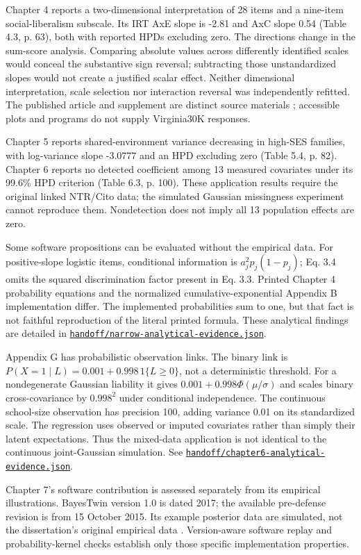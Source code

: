 \documentclass[11pt]{article}
\newcommand{\file}[1]{\href{https://github.com/alectionary/vibe-math/blob/master/formalization/schwabe-psychometric-genetics/#1}{\nolinkurl{#1}}}
\begin{document}
Chapter 4 reports a two-dimensional interpretation of 28 items and a nine-item social-liberalism subscale. Its IRT AxE slope is -2.81 and AxC slope 0.54 (Table 4.3, p. 63), both with reported HPDs excluding zero. The directions change in the sum-score analysis. Comparing absolute values across differently identified scales would conceal the substantive sign reversal; subtracting those unstandardized slopes would not create a justified scalar effect. Neither dimensional interpretation, scale selection nor interaction reversal was independently refitted. The published article and supplement are distinct source materials \citep{schwabeConservatism}; accessible plots and programs do not supply Virginia30K responses.

Chapter 5 reports shared-environment variance decreasing in high-SES families, with log-variance slope -3.0777 and an HPD excluding zero (Table 5.4, p. 82). Chapter 6 reports no detected coefficient among 13 measured covariates under its 99.6\% HPD criterion (Table 6.3, p. 100). These application results require the original linked NTR/Cito data; the simulated Gaussian missingness experiment cannot reproduce them. Nondetection does not imply all 13 population effects are zero.

Some software propositions can be evaluated without the empirical data. For positive-slope logistic items, conditional information is $a_j^2p_j(1-p_j)$; Eq. 3.4 omits the squared discrimination factor present in Eq. 3.3. Printed Chapter 4 probability equations and the normalized cumulative-exponential Appendix B implementation differ. The implemented probabilities sum to one, but that fact is not faithful reproduction of the literal printed formula. These analytical findings are detailed in \file{handoff/narrow-analytical-evidence.json}.

Appendix G has probabilistic observation links. The binary link is $P(X=1\mid L)=0.001+0.998\,1\{L\geq0\}$, not a deterministic threshold. For a nondegenerate Gaussian liability it gives $0.001+0.998\Phi(\mu/\sigma)$ and scales binary cross-covariance by $0.998^2$ under conditional independence. The continuous school-size observation has precision 100, adding variance 0.01 on its standardized scale. The regression uses observed or imputed covariates rather than simply their latent expectations. Thus the mixed-data application is not identical to the continuous joint-Gaussian simulation. See \file{handoff/chapter6-analytical-evidence.json}.

Chapter 7's software contribution is assessed separately from its empirical illustrations. BayesTwin version 1.0 is dated 2017; the available pre-defense revision is from 15 October 2015. Its example posterior data are simulated, not the dissertation's original empirical data \citep{bayestwin}. Version-aware software replay and probability-kernel checks establish only those specific implementation properties.
\end{document}
